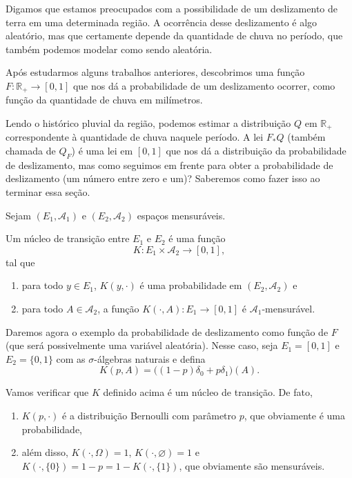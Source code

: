 Digamos que estamos preocupados com a possibilidade de um deslizamento de terra em uma determinada região.
A ocorrência desse deslizamento é algo aleatório, mas que certamente depende da quantidade de chuva no período, que também podemos modelar como sendo aleatória.

Após estudarmos alguns trabalhos anteriores, descobrimos uma função $F:\mathbb{R}_+ \to [0,1]$ que nos dá a probabilidade de um deslizamento ocorrer, como função da quantidade de chuva em milímetros.

Lendo o histórico pluvial da região, podemos estimar a distribuição $Q$ em $\mathbb{R}_+$ correspondente à quantidade de chuva naquele período.
A lei $F_* Q$ (também chamada de $Q_F$) é uma lei em $[0,1]$ que nos dá a distribuição da probabilidade de deslizamento, mas como seguimos em frente para obter a probabilidade de deslizamento (um número entre zero e um)?
Saberemos como fazer isso ao terminar essa seção.

Sejam $(E_1, \mathcal{A}_1)$ e $(E_2, \mathcal{A}_2)$ espaços mensuráveis.
\begin{definition}
  Um núcleo de transição entre $E_1$ e $E_2$ é uma função 
  \begin{equation}
    K: E_1 \times \mathcal{A}_2 \to [0,1],
  \end{equation}
  tal que
  \begin{enumerate}[\quad a)]
  \item para todo $y \in E_1$, $K(y,\cdot)$ é uma probabilidade em $(E_2, \mathcal{A}_2)$ e
  \item para todo $A \in \mathcal{A}_2$, a função $K(\cdot, A): E_1 \to [0,1]$ é $\mathcal{A}_1$-mensurável.
  \end{enumerate}
\end{definition}

\begin{example}
  \label{x:chance_deslizamento}
  Daremos agora o exemplo da probabilidade de deslizamento como função de $F$ (que será possivelmente uma variável aleatória).
  Nesse caso, seja $E_1 = [0,1]$ e $E_2 = \{0,1\}$ com as $\sigma$-álgebras naturais e defina
  \begin{equation}
    K(p, A) = \big( (1-p)\delta_0 + p \delta_1 \big) (A).
  \end{equation}
\end{example}

Vamos verificar que $K$ definido acima é um núcleo de transição.
De fato,
\begin{enumerate}[\quad i)]
\item $K(p, \cdot)$ é a distribuição Bernoulli com parâmetro $p$, que obviamente é uma probabilidade,
\item além disso, $K(\cdot, \Omega) = 1$, $K(\cdot, \varnothing) = 1$ e $K(\cdot, \{0\}) = 1-p = 1 - K(\cdot,\{1\})$, que obviamente são mensuráveis.
\end{enumerate}

